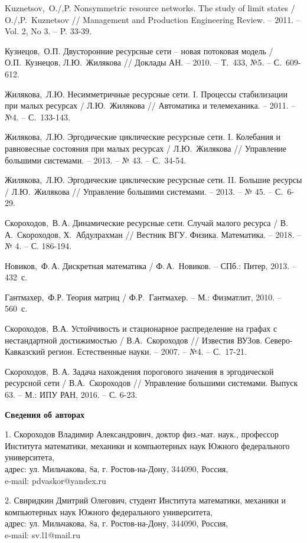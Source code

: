 \documentclass[a4paper,12pt]{article}
\begin{document}
\begin{thebibliography}{90}
 Kuznetsov,~O./,P. Nonsymmetric resource networks. The study of limit states / O./,P.~Kuznetsov // Management and Production Engineering Review. -- 2011. -- Vol. 2, No 3. -- P. 33-39.

 Кузнецов,~О.П. Двусторонние ресурсные сети -- новая потоковая модель / О.П.~Кузнецов, Л.Ю.~Жилякова // Доклады АН. -- 2010. -- Т.~433, №5. -- С.~609-612.

 Жилякова,~Л.Ю. Несимметричные ресурсные сети. I. Процессы стабилизации при малых ресурсах / Л.Ю.~Жилякова // Автоматика и телемеханика. -- 2011. -- №4. -- С.~133-143.

 Жилякова,~Л.Ю. Эргодические циклические ресурсные сети. I. Колебания и равновесные состояния при малых ресурсах / Л.Ю.~Жилякова // Управление большими системами. -- 2013. -- № 43. -- С.~34-54.

 Жилякова,~Л.Ю. Эргодические циклические ресурсные сети. II. Большие ресурсы / Л.Ю.~Жилякова // Управление большими системами. -- 2013.  -- № 45. -- С.~6-29.

 Скороходов,~В.\,А. Динамические ресурсные сети. Случай малого ресурса / В.\,А.~Скороходов, Х.~Абдулрахман // Вестник ВГУ. Физика. Математика. -- 2018. -- № 4. -- С. 186-194.

  Новиков,~Ф.\,А. Дискретная математика / Ф.\,А.~Новиков.  -- СПб.: Питер, 2013. -- 432~с.

 Гантмахер,~Ф.Р. Теория матриц / Ф.Р.~Гантмахер. -- М.: Физматлит, 2010. -- 560~с.

 Скороходов,~В.А. Устойчивость и стационарное распределение на графах с нестандартной достижимостью / В.А.~Скороходов // Известия ВУЗов. Северо-Кавказский регион. Естественные науки. -- 2007. -- №4. -- С.~17-21.

 Скороходов,~В.\,А. Задача нахождения порогового значения в эргодической ресурсной сети / В.А.~Скороходов // Управление большими системами. Выпуск 63. -- М.: ИПУ РАН, 2016. -- С. 6-23.
		
	\end{thebibliography}

\newpage

{\bf Сведения об авторах}

1. Скороходов Владимир Александрович, доктор физ.-мат. наук., профессор Института математики, механики и компьютерных наук Южного федерального университета,\\ адрес: ул. Мильчакова, 8а, г. Ростов-на-Дону, 344090, Россия, \\e-mail: pdvaskor@yandex.ru

\vspace{4pt}
2. Свиридкин Дмитрий Олегович, студент Института математики, механики и компьютерных наук Южного федерального университета,\\ 
адрес: ул. Мильчакова, 8а, г. Ростов-на-Дону, 344090, Россия, \\e-mail: sv.l1@mail.ru
\end{document}
